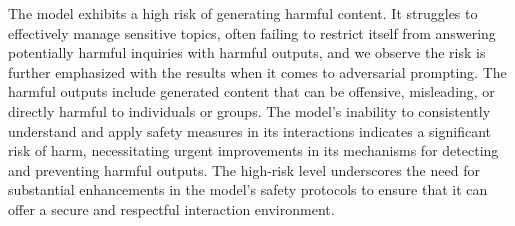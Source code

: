 The model exhibits a high risk of generating harmful content. It struggles to effectively manage sensitive topics, often failing to restrict itself from answering potentially harmful inquiries with harmful outputs, and we observe the risk is further emphasized with the results when it comes to adversarial prompting. The harmful outputs include generated content that can be offensive, misleading, or directly harmful to individuals or groups. The model's inability to consistently understand and apply safety measures in its interactions indicates a significant risk of harm, necessitating urgent improvements in its mechanisms for detecting and preventing harmful outputs. The high-risk level underscores the need for substantial enhancements in the model's safety protocols to ensure that it can offer a secure and respectful interaction environment.